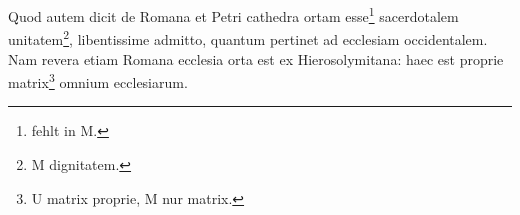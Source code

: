 Quod autem dicit de Romana et Petri cathedra ortam esse\footnote{fehlt in M.} sacerdotalem unitatem\footnote{M dignitatem.}, libentissime admitto, quantum pertinet ad ecclesiam occidentalem. Nam revera etiam Romana ecclesia orta est ex Hierosolymitana: haec est proprie matrix\footnote{U matrix proprie, M nur matrix.} omnium ecclesiarum.
